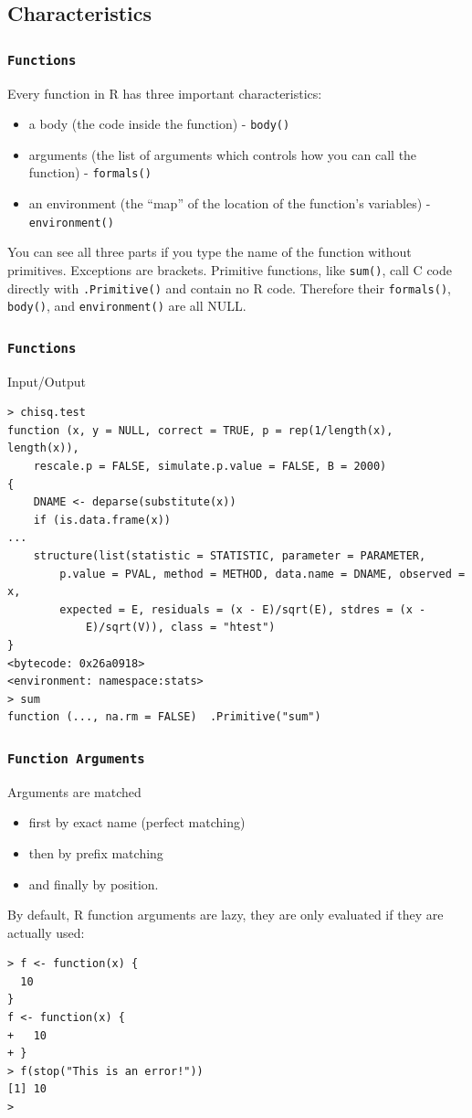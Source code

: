 \documentclass[xcolor={table},c]{beamer}
\begin{document}
\subsection{Characteristics}
\begin{frame}[fragile]\frametitle{\texttt{Functions}}
Every function in R has three important characteristics:
\begin{itemize}
\item a body (the code inside the function) - \texttt{body()}
\item arguments (the list of arguments which controls how you can call the function) - \texttt{formals()}
\item an environment (the “map” of the location of the function’s variables) - \texttt{environment()}
\end{itemize}
You can see all three parts if you type the name of the function without primitives. Exceptions are brackets. Primitive functions, like \texttt{sum()}, call C code directly with \texttt{.Primitive()} and contain no R code. Therefore their \texttt{formals()}, \texttt{body()}, and \texttt{environment()} are all NULL.
\end{frame}

\begin{frame}[fragile]\frametitle{\texttt{Functions}}
\begin{exampleblock}{Input/Output}\scriptsize
\begin{verbatim}
> chisq.test
function (x, y = NULL, correct = TRUE, p = rep(1/length(x), length(x)), 
    rescale.p = FALSE, simulate.p.value = FALSE, B = 2000) 
{
    DNAME <- deparse(substitute(x))
    if (is.data.frame(x)) 
...
    structure(list(statistic = STATISTIC, parameter = PARAMETER, 
        p.value = PVAL, method = METHOD, data.name = DNAME, observed = x, 
        expected = E, residuals = (x - E)/sqrt(E), stdres = (x - 
            E)/sqrt(V)), class = "htest")
}
<bytecode: 0x26a0918>
<environment: namespace:stats>
> sum
function (..., na.rm = FALSE)  .Primitive("sum")
\end{verbatim}
\end{exampleblock}
\end{frame}


\begin{frame}[fragile]\frametitle{\texttt{Function Arguments}}
Arguments are matched 
  \begin{itemize}
  \item first by exact name (perfect matching)
  \item then by prefix matching
  \item and finally by position.
  \end{itemize}
By default, R function arguments are lazy, they are only evaluated if they are actually used:
\begin{verbatim}
> f <- function(x) {
  10
}
f <- function(x) {
+   10
+ }
> f(stop("This is an error!"))
[1] 10
> 
\end{verbatim}
\end{frame}
\end{document}
